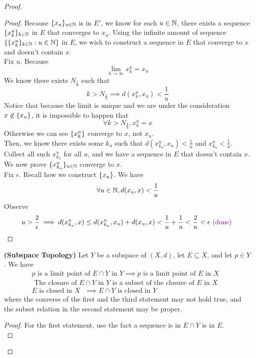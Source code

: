 \documentclass{report}
\begin{document}
\begin{proof}
\begin{proof}
Because $\{ x_u \}_{u\in\mathbb{N}}$ is in $E'$, we know for each  $u\in\mathbb{N}$, there exists a sequence  $\{ x^u_k \}_{k\in\mathbb{N}}$ in $E$ that converges to $x_u$. Using the infinite amount of sequence $\{ \{ x^u_k \}_{k\in\mathbb{N}}:u\in\mathbb{N} \}$ in $E$, we wish to construct a sequence in $E$ that converge to  $x$ and doesn't contain  $x$.\\

Fix $u$. Because 
\begin{equation}
\lim_{k\to\infty} x_k^u=x_u
\end{equation}
We know there exists $N_{\frac{1}{u}}$ such that
\begin{equation}
k>N_{\frac{1}{u}}\implies d(x_k^u,x_u)<\frac{1}{u}
\end{equation}
Notice that because the limit is unique and we are under the consideration $x\not\in \{ x_n \}$, it is impossible to happen that 
\begin{equation}
\forall k>N_{\frac{1}{u}}, x_k^u=x
\end{equation}
Otherwise we can see $\{ x^n_k \}$ converge to $x$, not  $x_n$.\\

Then, we know there exists some  $k_u$ such that  $d(x_{k_u}^u,x_u)<\frac{1}{u}$ and $x_{k_u}^u<\frac{1}{u}$. Collect all such $x^u_{k_u}$ for all $u$, and we have a sequence in  $E$ that doesn't contain $x$. We now prove $\{ x^u_{k_u} \}_{u\in\mathbb{N}}$ converge to $x$.\\

Fix $\epsilon $. Recall how we construct $\{ x_u \}$. We have
\begin{equation}
\forall u\in\mathbb{N}, d(x_u,x)<\frac{1}{u}
\end{equation}
Observe  
\begin{equation}
u>\frac{2}{\epsilon }\implies d(x^u_{k_u},x)\leq d(x^u_{k_u},x_u)+d(x_u,x)<\frac{1}{u}+\frac{1}{u}<\frac{2}{u}<\epsilon \textcolor{violet}{\text{ (done) }}
\end{equation}
\end{proof}
\begin{theorem}
\label{3.2.11}
\textbf{(Subspace Topology)} Let $Y$ be a subspace of  $(X,d)$, let $E\subseteq X$, and let $p\in Y$. We have
\begin{gather}
p\text{ is a limit point of $E\cap Y$ in }Y\implies p\text{ is a limit point of $E$ in  $X$ }\\
\text{ The closure of $E\cap Y$  in $Y$ is a subset of the closure of $E$ in $X$ }\\
E\text{ is closed in $X$ }\implies  E\cap Y\text{ is closed in $Y$ }
\end{gather}
where the converse of the first and the third statement may not hold true, and the subset relation in the second statement may be proper. 
\end{theorem}
\begin{proof}
For the first statement, use the fact a sequence is in $E\cap Y$ is in $E$.\\


\end{proof}
\end{proof}
\end{document}
